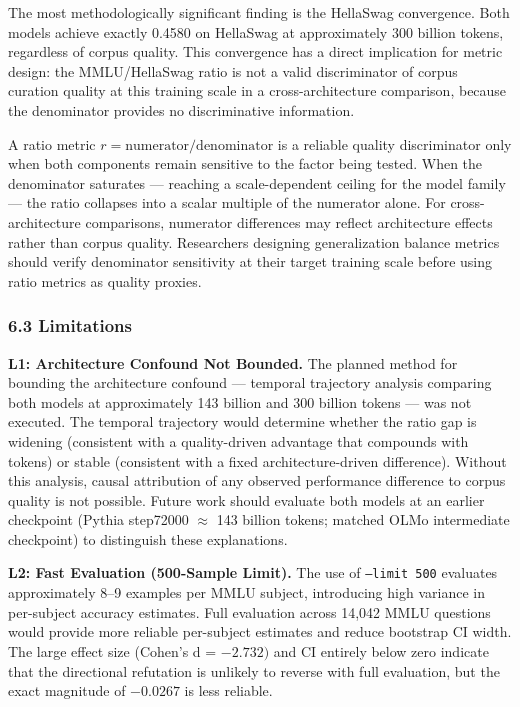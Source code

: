 The most methodologically significant finding is the HellaSwag convergence. Both models achieve exactly 0.4580 on HellaSwag at approximately 300 billion tokens, regardless of corpus quality. This convergence has a direct implication for metric design: the MMLU/HellaSwag ratio is not a valid discriminator of corpus curation quality at this training scale in a cross-architecture comparison, because the denominator provides no discriminative information.

A ratio metric $r = \text{numerator} / \text{denominator}$ is a reliable quality discriminator only when both components remain sensitive to the factor being tested. When the denominator saturates --- reaching a scale-dependent ceiling for the model family --- the ratio collapses into a scalar multiple of the numerator alone. For cross-architecture comparisons, numerator differences may reflect architecture effects rather than corpus quality. Researchers designing generalization balance metrics should verify denominator sensitivity at their target training scale before using ratio metrics as quality proxies.

\subsubsection{6.3 Limitations}

\textbf{L1: Architecture Confound Not Bounded.} The planned method for bounding the architecture confound --- temporal trajectory analysis comparing both models at approximately 143 billion and 300 billion tokens --- was not executed. The temporal trajectory would determine whether the ratio gap is widening (consistent with a quality-driven advantage that compounds with tokens) or stable (consistent with a fixed architecture-driven difference). Without this analysis, causal attribution of any observed performance difference to corpus quality is not possible. Future work should evaluate both models at an earlier checkpoint (Pythia step72000 $\approx$ 143 billion tokens; matched OLMo intermediate checkpoint) to distinguish these explanations.

\textbf{L2: Fast Evaluation (500-Sample Limit).} The use of \texttt{--limit 500} evaluates approximately 8--9 examples per MMLU subject, introducing high variance in per-subject accuracy estimates. Full evaluation across 14,042 MMLU questions would provide more reliable per-subject estimates and reduce bootstrap CI width. The large effect size (Cohen's d = $-2.732)$ and CI entirely below zero indicate that the directional refutation is unlikely to reverse with full evaluation, but the exact magnitude of $-0.0267$ is less reliable.

